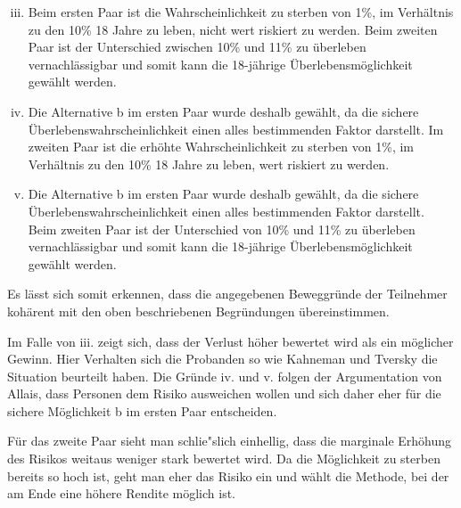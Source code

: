 \documentclass[11pt]{article}
\begin{document}
\begin{enumerate}[i.]
  \setcounter{enumi}{2}
\item Beim ersten Paar ist die Wahrscheinlichkeit zu sterben von 1\%, im Verhältnis zu den 10\% 18 Jahre zu leben, nicht wert riskiert zu werden. Beim zweiten Paar ist der Unterschied zwischen 10\% und 11\% zu überleben vernachlässigbar und somit kann die 18-jährige Überlebensmöglichkeit gewählt werden.
\item Die Alternative b im ersten Paar wurde deshalb gewählt, da die sichere Überlebenswahrscheinlichkeit einen alles bestimmenden Faktor darstellt. Im zweiten Paar ist die erhöhte Wahrscheinlichkeit zu sterben von 1\%, im Verhältnis zu den 10\% 18 Jahre zu leben, wert riskiert zu werden.
\item Die Alternative b im ersten Paar wurde deshalb gewählt, da die sichere Überlebenswahrscheinlichkeit einen alles bestimmenden Faktor darstellt. Beim zweiten Paar ist der Unterschied von 10\% und 11\% zu überleben vernachlässigbar und somit kann die 18-jährige Überlebensmöglichkeit gewählt werden.
\end{enumerate}

Es lässt sich somit erkennen, dass die angegebenen Beweggründe der Teilnehmer kohärent mit den oben beschriebenen Begründungen übereinstimmen.

Im Falle von iii. zeigt sich, dass der Verlust höher bewertet wird als ein möglicher Gewinn. Hier Verhalten sich die Probanden so wie Kahneman und Tversky \parencite[siehe][S. 4]{oliver2003quantitative} die Situation beurteilt haben. Die Gründe iv. und v. folgen der Argumentation von Allais, dass Personen dem Risiko ausweichen wollen und sich daher eher für die sichere Möglichkeit b im ersten Paar entscheiden.

Für das zweite Paar sieht man schlie"slich einhellig, dass die marginale Erhöhung des Risikos weitaus weniger stark bewertet wird. Da die Möglichkeit zu sterben bereits so hoch ist, geht man eher das Risiko ein und wählt die Methode, bei der am Ende eine höhere Rendite möglich ist.


\printbibliography
\end{document}
